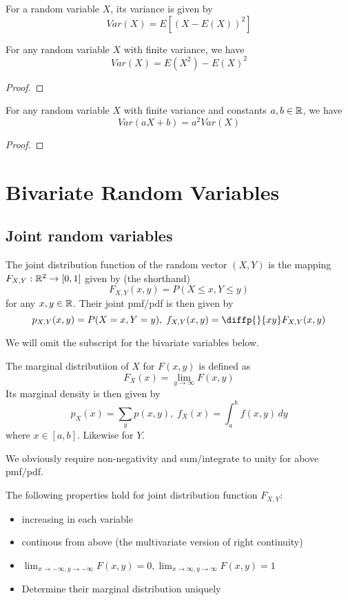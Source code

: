 \documentclass[11pt]{article}
\begin{document}
\begin{definition}[Variance]
  For a random variable \(X\), its variance is given by
  \[Var(X)=E[(X-E(X))^2]\]
\end{definition}
\begin{theorem}
  For any random variable \(X\) with finite variance, we have 
  \[Var(X)=E(X^2)-E(X)^2\]
\end{theorem}
\begin{proof}
\end{proof}

\begin{proposition}
  For any random variable \(X\) with finite variance and constants \(a,b\in\mathbb{R}\), we have
  \[Var(aX+b)=a^2Var(X)\]
\end{proposition}
\begin{proof}
\end{proof}

\section{Bivariate Random Variables}
\subsection{Joint random variables}
\begin{definition}
  The joint distribution function of the random vector \((X,Y)\) is the mapping \(F_{X,Y}:\mathbb{R}^2\to[0,1]\) given by (the shorthand)
  \[F_{X,Y}(x,y)=P(X\leq x,Y\leq y)\]
  for any \(x,y\in\mathbb{R}\). Their joint pmf/pdf is then given by 
  \[p_{X,Y}(x,y)=P(X=x,Y=y), \; f_{X,Y}(x,y)=\diffp{}{{x}{y}}F_{X,Y}(x,y)\]
\end{definition}
We will omit the subscript for the bivariate variables below.

\begin{definition}
  The marginal distributiion of \(X\) for \(F(x,y)\) is defined as
  \[F_X(x)=\lim_{y\to\infty}F(x,y)\]
  Its marginal density is then given by 
  \[p_X(x)=\sum_{y}p(x,y),\; f_X(x)=\int_{a}^{b}f(x,y)\,dy\]
  where \(x\in[a,b]\). Likewise for \(Y\).
\end{definition}
We obviously require non-negativity and sum/integrate to unity for above pmf/pdf.

\begin{proposition}
  The following properties hold for joint distribution function \(F_{X,Y}\):
  \begin{itemize}
    \item increasing in each variable
    \item continous from above (the multivariate version of right continuity)
    \item \(\lim_{x\to -\infty,y\to -\infty}F(x,y)=0, \lim_{x\to \infty,y\to \infty}F(x,y)=1\)
    \item Determine their marginal distribution uniquely
  \end{itemize}
\end{proposition}
\end{document}
